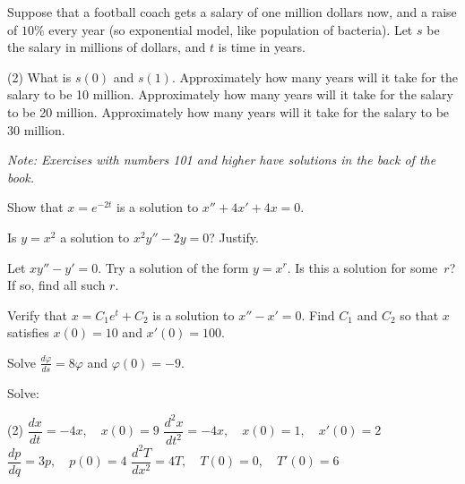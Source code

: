 \begin{exercise}
Suppose that a football coach gets a salary of
one million dollars now, and a raise of $10\%$ every year
(so exponential model, like population of bacteria).
Let $s$ be the salary in millions of dollars, and $t$ is time in years.
\begin{tasks}(2)
\task
What is $s(0)$ and $s(1)$.
\task
Approximately how many years will it take for the salary to be 10 million.
\task
Approximately how many years will it take for the salary to be 20 million.
\task
Approximately how many years will it take for the salary to be 30 million.
\end{tasks}
\end{exercise}


\noindent
\emph{Note: Exercises with numbers 101 and higher have solutions in the
back of the book.}


\setcounter{exercise}{100}

\begin{exercise}
Show that $x = e^{-2t}$ is a solution to $x'' + 4x' + 4x = 0$.
\end{exercise}

\begin{exercise}
Is $y = x^2$ a solution to $x^2y'' - 2y = 0$?  Justify.
\end{exercise}

\begin{exercise}
Let $xy'' - y' = 0$.  Try a solution of the form $y = x^r$.  Is this a
solution for some~$r$?  If so, find all such $r$.
\end{exercise}


\begin{exercise}
Verify that $x=C_1e^t+C_2$ is a solution to $x''-x' = 0$.  Find $C_1$ and
$C_2$ so that $x$ satisfies $x(0) = 10$ and $x'(0) = 100$.
\end{exercise}

\begin{exercise}
Solve $\frac{d\varphi}{ds} = 8 \varphi$ and $\varphi(0) = -9$.
\end{exercise}

\begin{exercise}
Solve:
\begin{tasks}(2)
\task $\dfrac{dx}{dt} = -4x, \quad x(0)=9$
\task $\dfrac{d^2x}{dt^2} = -4x, \quad x(0)=1, \quad x'(0)=2$
\task $\dfrac{dp}{dq} = 3 p, \quad p(0)=4$
\task $\dfrac{d^2T}{dx^2} = 4 T, \quad T(0)=0, \quad T'(0)=6$
\end{tasks}
\end{exercise}

